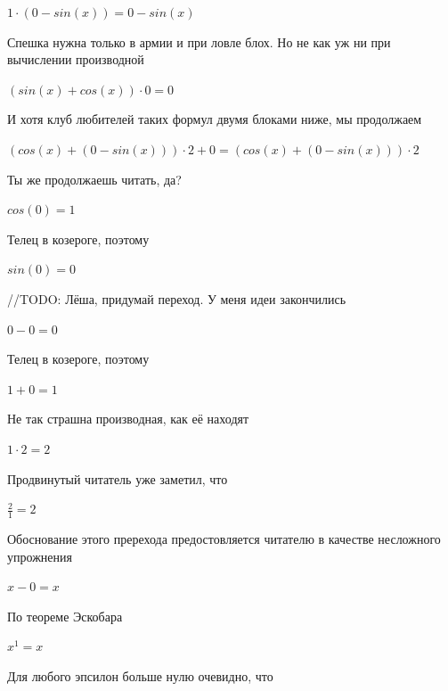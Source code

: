 \documentclass[12pt,a4paper,fleqn]{article}
\begin{document}
\begin{center}
\begin{center}
\begin{center}
\begin{center}
\begin{center}
$1 \cdot (0-sin(x)) = 0-sin(x)$\end{center}
Спешка нужна только в армии и при ловле блох. Но не как уж ни при вычислении производной\cite{link2}

\begin{center}
$(sin(x)+cos(x)) \cdot 0 = 0$\end{center}
И хотя клуб любителей таких формул двумя блоками ниже, мы продолжаем

\begin{center}
$(cos(x)+(0-sin(x))) \cdot 2+0 = (cos(x)+(0-sin(x))) \cdot 2$\end{center}
Ты же продолжаешь читать, да?

\begin{center}
\begin{center}$cos(0) = 1$\end{center}
Телец в козероге, поэтому

\begin{center}
\begin{center}$sin(0) = 0$\end{center}
//TODO: Лёша, придумай переход. У меня идеи закончились

\begin{center}
\begin{center}$0-0 = 0$\end{center}
Телец в козероге, поэтому

\begin{center}
\begin{center}$1+0 = 1$\end{center}
Не так страшна производная, как её находят\cite{link2}

\begin{center}
\begin{center}$1 \cdot 2 = 2$\end{center}
Продвинутый читатель уже заметил, что

\begin{center}
\begin{center}$\frac{2}{1} = 2$\end{center}
Обоснование этого пререхода предостовляется читателю в качестве несложного упрожнения

\begin{center}
$x-0 = x$\end{center}
По теореме Эскобара

\begin{center}
$x^{1} = x$\end{center}
Для любого эпсилон больше нулю очевидно, что


\end{center}
\end{center}
\end{center}
\end{center}
\end{center}
\end{center}
\end{center}
\end{center}
\end{center}
\end{center}
\end{document}
